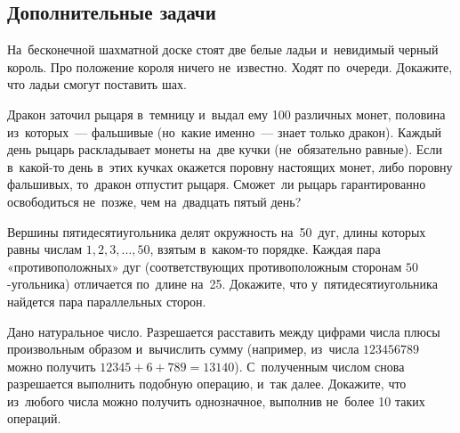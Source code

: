 

\subsection*{Дополнительные задачи}



\begin{problems}

\item
На~бесконечной шахматной доске стоят две белые ладьи и~невидимый черный король.
Про положение короля ничего не~известно.
Ходят по~очереди.
Докажите, что ладьи смогут поставить шах.

\item
Дракон заточил рыцаря в~темницу и~выдал ему 100 различных монет, половина
из~которых~— фальшивые (но~какие именно~— знает только дракон).
Каждый день рыцарь раскладывает монеты на~две кучки (не~обязательно равные).
Если в~какой-то день в~этих кучках окажется поровну настоящих монет, либо
поровну фальшивых, то~дракон отпустит рыцаря.
Сможет~ли рыцарь гарантированно освободиться не~позже, чем на~двадцать пятый
день?

\item
Вершины пятидесятиугольника делят окружность на~50~дуг, длины которых равны
числам $1, 2, 3, \ldots, 50$, взятым в~каком-то порядке.
Каждая пара «противоположных» дуг (соответствующих противоположным сторонам
$50$-угольника) отличается по~длине на~25.
Докажите, что у~пятидесятиугольника найдется пара параллельных сторон.

\item
Дано натуральное число.
Разрешается расставить между цифрами числа плюсы произвольным образом
и~вычислить сумму (например, из~числа $123456789$ можно получить
$12345 + 6 + 789 = 13140$).
С~полученным числом снова разрешается выполнить подобную операцию, и~так далее.
Докажите, что из~любого числа можно получить однозначное, выполнив не~более
10 таких операций.

\end{problems}


